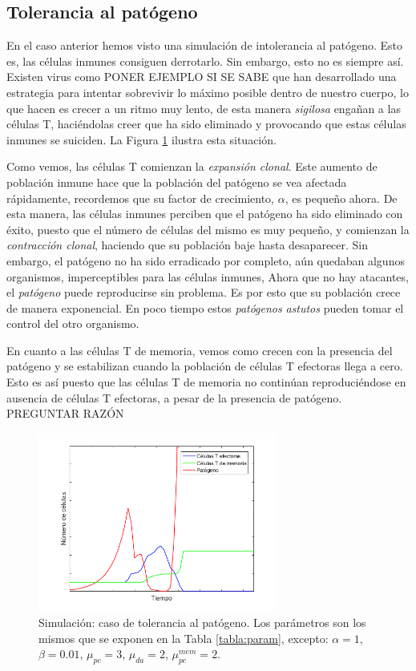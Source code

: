 \subsection{Tolerancia al patógeno}
\label{sim:toler}

En el caso anterior hemos visto una simulación de intolerancia al patógeno. Esto es, las células inmunes consiguen derrotarlo. Sin embargo, esto no es siempre así. Existen virus como PONER EJEMPLO SI SE SABE que han desarrollado una estrategia para intentar sobrevivir lo máximo posible dentro de nuestro cuerpo, lo que hacen es crecer a un ritmo muy lento, de esta manera \textit{sigilosa} engañan a las células T, haciéndolas creer que ha sido eliminado y provocando que estas células inmunes se suiciden. La Figura \ref{fig:tolerance} ilustra esta situación.

Como vemos, las células T comienzan la \textit{expansión clonal}. Este aumento de población inmune hace que la población del patógeno se vea afectada rápidamente, recordemos que su factor de crecimiento, $\alpha$, es pequeño ahora. De esta manera, las células inmunes perciben que el patógeno ha sido eliminado con éxito, puesto que el número de células del mismo es muy pequeño, y comienzan la \textit{contracción clonal}, haciendo que su población baje hasta desaparecer. Sin embargo, el patógeno no ha sido erradicado por completo, aún quedaban algunos organismos, imperceptibles para las células inmunes, Ahora que no hay atacantes, el \textit{patógeno} puede reproducirse sin problema. Es por esto que su población crece de manera exponencial. En poco tiempo estos \textit{patógenos} \textit{astutos} pueden tomar el control del otro organismo. 

En cuanto a las células T de memoria, vemos como crecen con la presencia del patógeno y se estabilizan cuando la población de células T efectoras llega a cero. Esto es así puesto que las células T de memoria no continúan reproduciéndose en ausencia de células T efectoras, a pesar de la presencia de patógeno. PREGUNTAR RAZÓN 

\begin{figure}[t]
	\centering
	\includegraphics[width=0.7\textwidth]{Imagenes/Simulaciones/tolerance}
	\caption{Simulación: caso de tolerancia al patógeno. Los parámetros son los mismos que se exponen en la Tabla \ref{tabla:param}, excepto: $\alpha = 1$, $\beta = 0.01$, $\mu_{pc} = 3$, $\mu_{da} = 2$, $\mu_{pc}^{mem} = 2$.}
	\label{fig:tolerance}
\end{figure}

